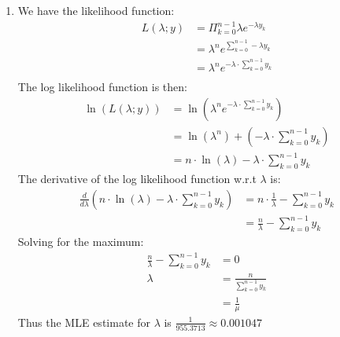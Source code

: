 \documentclass{article}
\begin{document}
\begin{enumerate}
\item We have the likelihood function: \\
\begin{align*}
L(\lambda;y) &= \Pi_{k = 0}^{n-1}\lambda e^{-\lambda y_k} \\
&= \lambda^ne^{\sum_{k=0}^{n-1}-\lambda y_k} \\
&= \lambda^ne^{-\lambda \cdot \sum_{k=0}^{n-1} y_k} \\
\end{align*}
The log likelihood function is then: \\
\begin{align*}
\ln(L(\lambda;y)) &= \ln(\lambda^ne^{-\lambda \cdot \sum_{k=0}^{n-1} y_k}) \\
&= \ln(\lambda^n) + (-\lambda \cdot \sum_{k=0}^{n-1} y_k) \\
&= n \cdot \ln(\lambda) -\lambda \cdot \sum_{k=0}^{n-1} y_k
\end{align*}
The derivative of the log likelihood function w.r.t $\lambda$ is: \\
\begin{align*}
\frac{d}{d\lambda} (n \cdot \ln(\lambda) -\lambda \cdot \sum_{k=0}^{n-1} y_k) &= n \cdot \frac{1}{\lambda} - \sum_{k=0}^{n-1} y_k \\
&= \frac{n}{\lambda} - \sum_{k=0}^{n-1} y_k
\end{align*}
Solving for the maximum: \\
\begin{align*}
\frac{n}{\lambda} - \sum_{k=0}^{n-1} y_k &= 0 \\
\lambda &= \frac{n}{\sum_{k=0}^{n-1} y_k} \\
&= \frac{1}{\mu}
\end{align*}
Thus the MLE estimate for $\lambda$ is $\frac{1}{955.3713} \approx 0.001047$
\end{enumerate}
\end{document}
